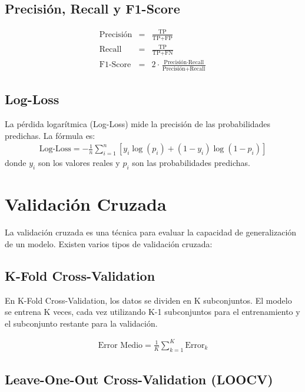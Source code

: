 \documentclass[a4paper]{report} %
\begin{document}
\subsection{Precisi\'on, Recall y F1-Score}

\begin{eqnarray*}
\text{Precisi\'on} &=& \frac{\text{TP}}{\text{TP} + \text{FP}} \\
\text{Recall} &=& \frac{\text{TP}}{\text{TP} + \text{FN}} \\
\text{F1-Score} &=& 2 \cdot \frac{\text{Precisi\'on} \cdot \text{Recall}}{\text{Precisi\'on} + \text{Recall}}
\end{eqnarray*}

\subsection{Log-Loss}

La p\'erdida logar\'itmica (Log-Loss) mide la precisi\'on de las probabilidades predichas. La f\'ormula es:
\begin{eqnarray*}
\text{Log-Loss} = -\frac{1}{n} \sum_{i=1}^{n} \left[ y_i \log(p_i) + (1 - y_i) \log(1 - p_i) \right]
\end{eqnarray*}
donde $y_i$ son los valores reales y $p_i$ son las probabilidades predichas.

\section{Validaci\'on Cruzada}

La validaci\'on cruzada es una t\'ecnica para evaluar la capacidad de generalizaci\'on de un modelo. Existen varios tipos de validaci\'on cruzada:

\subsection{K-Fold Cross-Validation}

En K-Fold Cross-Validation, los datos se dividen en K subconjuntos. El modelo se entrena K veces, cada vez utilizando K-1 subconjuntos para el entrenamiento y el subconjunto restante para la validaci\'on.

\begin{eqnarray*}
\text{Error Medio} = \frac{1}{K} \sum_{k=1}^{K} \text{Error}_k
\end{eqnarray*}

\subsection{Leave-One-Out Cross-Validation (LOOCV)}
\end{document}
